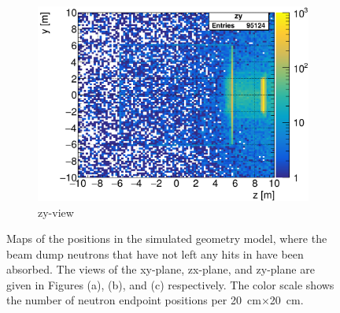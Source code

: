 \begin{figure}[h]
\begin{subfigure}[b]{0.45\textwidth}
    \includegraphics[width=\textwidth]{Figures/BeamDump/neutrons_EndpointMap_zy.png}
   \caption{zy-view}
   \end{subfigure}
   \hfill
   \begin{minipage}{0.45\textwidth}
   \hfill
    \end{minipage}
   \caption[Beam dump neutrons absorbed without leaving hit in \sid]{Maps of the positions in the simulated geometry model, where the beam dump neutrons that have not left any hits in \sid have been absorbed.
   The views of the xy-plane, zx-plane, and zy-plane are given in Figures (a), (b), and (c) respectively.
   The color scale shows the number of neutron endpoint positions per \SI[detect-all]{20}{\centi\meter}$\times$\SI[detect-all]{20}{\centi\meter}.}
   \label{fig:BeamDumps:NeutronMissedMaps}
\end{figure} 

